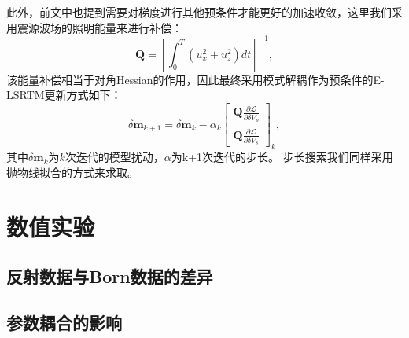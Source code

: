 此外，前文中也提到需要对梯度进行其他预条件才能更好的加速收敛，这里我们采用震源波场的照明能量来进行补偿：
\begin{equation}
	\mathbf{Q} =\left[\int^T_0(u^2_x+u^2_z)dt\right]^{-1},
    \label{eq:Gradient_Illumination_LSRTM}
\end{equation}
该能量补偿相当于对角Hessian的作用，因此最终采用模式解耦作为预条件的E-LSRTM更新方式如下：
\begin{equation}
        \delta\mathbf{m}_{k+1}=\delta\mathbf{m}_{k}-\alpha_k
        \begin{bmatrix}\mathbf{Q}{\frac{\partial\mathcal{L}}{\partial \delta V_p}}\\
		\mathbf{Q}{\frac{\partial\mathcal{L}}{\partial \delta V_s}}\end{bmatrix}_{k},
        \label{eq:Gradientmethod}
\end{equation}
其中$\delta\mathbf{m}_{k}$为$k$次迭代的模型扰动，$\alpha$为k+1次迭代的步长。
步长搜索我们同样采用抛物线拟合的方式来求取。
\section{数值实验}
\subsection{反射数据与Born数据的差异}
\subsection{参数耦合的影响}
